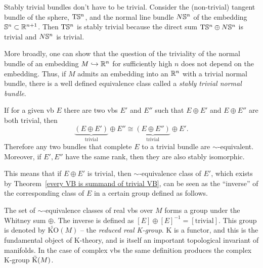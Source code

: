 \begin{example}
    Stably trivial bundles don't have to be trivial. Consider the (non-trivial) tangent bundle of the sphere, $\mathrm{T}\mathbb{S}^n$, and  the normal line bundle $N\mathbb{S}^n$ of the embedding $\mathbb{S}^n\subset \mathbb{R}^{n+1}$. Then $\mathrm{T}\mathbb{S}^n$ is stably trivial because the direct sum $\mathrm{T}\mathbb{S}^n\oplus N\mathbb{S}^n$ is trivial and $N\mathbb{S}^n$ is trivial.

    More broadly, one can show that the question of the triviality of the normal bundle of an embedding $M\hookrightarrow \mathbb{R}^n$ for sufficiently high $n$ does not depend on the embedding. Thus, if $M$ admits an embedding into an $\mathbb{R}^n$ with a trivial normal bundle, there is a well defined equivalence class called a \emph{stably trivial normal bundle}.
\end{example}


\begin{cor}
If for a given \gls{vb} $E$ there are two \glspl{vb} $E'$ and $E''$ such that $E\oplus E'$ and $E\oplus E''$ are both trivial, then 
\[
\underbrace{(E\oplus E')}_{\text{trivial}}\oplus E''\cong \underbrace{(E\oplus E'')}_{\text{trivial}}\oplus E'.\]
Therefore any two bundles that complete $E$ to a trivial bundle are $\sim$-equivalent. Moreover, if $E',E''$ have the same rank, then they are also stably isomorphic.
\end{cor}

This means that if $E\oplus E'$ is trivial, then $\sim$-equivalence class of $E'$, which exists by Theorem~\ref{every VB is summand of trivial VB}, can be seen as the ``inverse'' of the corresponding class of $E$ in a certain group defined as follows.

\begin{defn}
The set of $\sim$-equivalence classes of real \glspl{vb} over $M$ forms a group under the Whitney sum $\oplus$.
The inverse is defined as $[E]\oplus [E]^{-1}=[\text{trivial}]$. This group is denoted by $\widetilde{\mathrm{KO}}(M)$ -- the \emph{reduced real K-group}. K is a functor, and this is the fundamental object of K-theory, and is itself an important topological invariant of manifolds. In the case of complex \glspl{vb} the same definition produces the complex K-group $\wt{\mathrm{K}}(M)$.
\end{defn}

